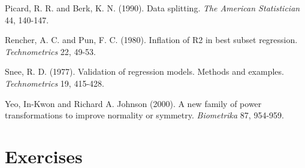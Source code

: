 \begin{multicols}{2}
Picard, R. R. and Berk, K. N. (1990). Data splitting. \textit{The
American Statistician} 44, 140-147.

Rencher, A. C. and Pun, F. C. (1980). Inflation of R2 in best subset
regression. \textit{Technometrics} 22, 49-53.

Snee, R. D. (1977). Validation of regression models. Methods and
examples. \textit{Technometrics} 19, 415-428.

Yeo, In-Kwon and Richard A. Johnson (2000). A new family of power
transformations to improve normality or symmetry.
\textit{Biometrika} 87, 954-959.


\end{multicols}


\section{Exercises}



